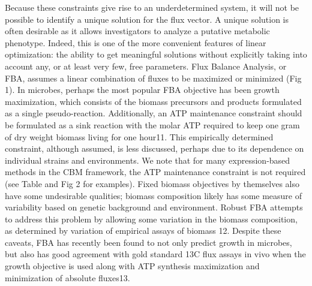 \documentclass[phd,tocprelim]{cornell}
\theoremstyle{break}
\theoremstyle{empty}
\begin{document}
Because these constraints give rise to an underdetermined system, it
will not be possible to identify a unique solution for the flux
vector. A unique solution is often desirable as it allows
investigators to analyze a putative metabolic phenotype. Indeed, this
is one of the more convenient features of linear optimization: the
ability to get meaningful solutions without explicitly taking into
account any, or at least very few, free parameters.  Flux Balance
Analysis, or FBA, assumes a linear combination of fluxes to be
maximized or minimized (Fig 1). In microbes, perhaps the most popular
FBA objective has been growth maximization, which consists of the
biomass precursors and products formulated as a single
pseudo-reaction. Additionally, an ATP maintenance constraint should be
formulated as a sink reaction with the molar ATP required to keep one
gram of dry weight biomass living for one hour11. This empirically
determined constraint, although assumed, is less discussed, perhaps
due to its dependence on individual strains and environments.  We note
that for many expression-based methods in the CBM framework, the ATP
maintenance constraint is not required (see Table and Fig 2 for
examples). Fixed biomass objectives by themselves also have some
undesirable qualities; biomass composition likely has some measure of
variability based on genetic background and environment.  Robust FBA
attempts to address this problem by allowing some variation in the
biomass composition, as determined by variation of empirical assays of
biomass 12.  Despite these caveats, FBA has recently been found to not
only predict growth in microbes, but also has good agreement with gold
standard 13C flux assays in vivo when the growth objective is used
along with ATP synthesis maximization and minimization of absolute
fluxes13.
\end{document}
